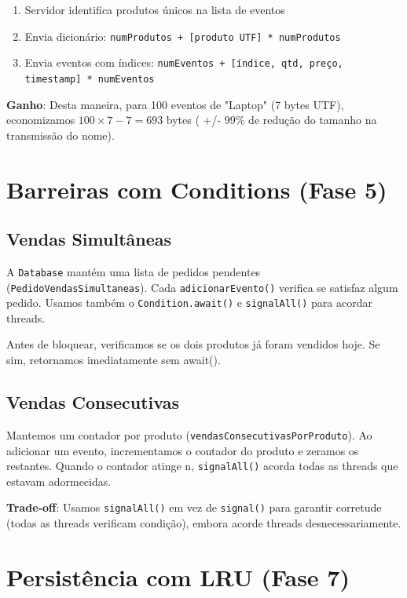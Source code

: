 \documentclass[11pt,a4paper]{article}
\begin{document}
\begin{enumerate}[noitemsep]
    \item Servidor identifica produtos únicos na lista de eventos
    \item Envia dicionário: \texttt{numProdutos + [produto UTF] * numProdutos}
    \item Envia eventos com índices: \texttt{numEventos + [índice, qtd, preço, timestamp] * numEventos}
\end{enumerate}

\textbf{Ganho}: Desta maneira, para 100 eventos de "Laptop" (7 bytes UTF), economizamos $100 \times 7 - 7 = 693$ bytes ( +/- 99\% de redução do tamanho na transmissão do nome).

\section{Barreiras com Conditions (Fase 5)}

\subsection{Vendas Simultâneas}

A \texttt{Database} mantém uma lista de pedidos pendentes (\texttt{PedidoVendasSimultaneas}). Cada \texttt{adicionarEvento()} verifica se satisfaz algum pedido. Usamos também o \texttt{Condition.await()} e \texttt{signalAll()} para acordar threads.

Antes de bloquear, verificamos se os dois produtos já foram vendidos hoje. Se sim, retornamos imediatamente sem await().

\subsection{Vendas Consecutivas}

Mantemos um contador por produto (\texttt{vendasConsecutivasPorProduto}). Ao adicionar um evento, incrementamos o contador do produto e zeramos os restantes. Quando o contador atinge n, \texttt{signalAll()} acorda todas as threads que estavam adormecidas.

\textbf{Trade-off}: Usamos \texttt{signalAll()} em vez de \texttt{signal()} para garantir corretude (todas as threads verificam condição), embora acorde threads desnecessariamente.

\section{Persistência com LRU (Fase 7)}
\end{document}
